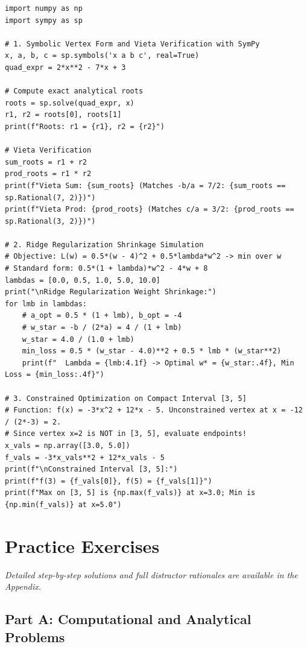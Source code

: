 \begin{lstlisting}[caption={Quadratic Analysis and Optimization in Python}]
import numpy as np
import sympy as sp

# 1. Symbolic Vertex Form and Vieta Verification with SymPy
x, a, b, c = sp.symbols('x a b c', real=True)
quad_expr = 2*x**2 - 7*x + 3

# Compute exact analytical roots
roots = sp.solve(quad_expr, x)
r1, r2 = roots[0], roots[1]
print(f"Roots: r1 = {r1}, r2 = {r2}")

# Vieta Verification
sum_roots = r1 + r2
prod_roots = r1 * r2
print(f"Vieta Sum: {sum_roots} (Matches -b/a = 7/2: {sum_roots == sp.Rational(7, 2)})")
print(f"Vieta Prod: {prod_roots} (Matches c/a = 3/2: {prod_roots == sp.Rational(3, 2)})")

# 2. Ridge Regularization Shrinkage Simulation
# Objective: L(w) = 0.5*(w - 4)^2 + 0.5*lambda*w^2 -> min over w
# Standard form: 0.5*(1 + lambda)*w^2 - 4*w + 8
lambdas = [0.0, 0.5, 1.0, 5.0, 10.0]
print("\nRidge Regularization Weight Shrinkage:")
for lmb in lambdas:
    # a_opt = 0.5 * (1 + lmb), b_opt = -4
    # w_star = -b / (2*a) = 4 / (1 + lmb)
    w_star = 4.0 / (1.0 + lmb)
    min_loss = 0.5 * (w_star - 4.0)**2 + 0.5 * lmb * (w_star**2)
    print(f"  Lambda = {lmb:4.1f} -> Optimal w* = {w_star:.4f}, Min Loss = {min_loss:.4f}")

# 3. Constrained Optimization on Compact Interval [3, 5]
# Function: f(x) = -3*x^2 + 12*x - 5. Unconstrained vertex at x = -12 / (2*-3) = 2.
# Since vertex x=2 is NOT in [3, 5], evaluate endpoints!
x_vals = np.array([3.0, 5.0])
f_vals = -3*x_vals**2 + 12*x_vals - 5
print(f"\nConstrained Interval [3, 5]:")
print(f"f(3) = {f_vals[0]}, f(5) = {f_vals[1]}")
print(f"Max on [3, 5] is {np.max(f_vals)} at x=3.0; Min is {np.min(f_vals)} at x=5.0")
\end{lstlisting}

\newpage
\section{Practice Exercises}
\textit{Detailed step-by-step solutions and full distractor rationales are available in the Appendix.}

\subsection*{Part A: Computational and Analytical Problems}

